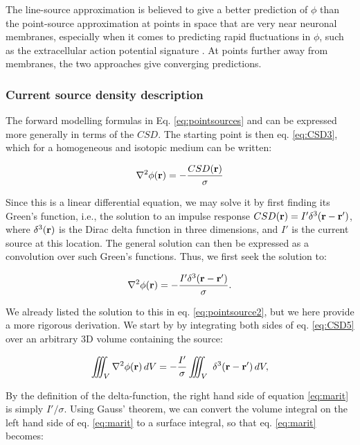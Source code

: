 The line-source approximation is believed to give a better prediction of $\phi$ than the point-source approximation at points in space that are very near neuronal membranes, especially when it comes to predicting rapid fluctuations in $\phi$, such as the extracellular action potential signature \citep{Holt1999}. At points further away from membranes, the two approaches give converging predictions.


\subsubsection{Current source density description}
The forward modelling formulas in Eq. \ref{eq:pointsources} and \label{eq:linesources} can be expressed more generally in terms of the $CSD$. The starting point is then eq. \ref{eq:CSD3}, which for a homogeneous and isotopic medium can be written: 

\begin{equation}
\nabla^2 \phi({\bf r}) = - \frac{CSD({\bf r})}{\sigma}
\label{eq:CSD4}
\end{equation}

Since this is a linear differential equation, we may solve it by first finding its Green's function, i.e., the solution to an impulse response $CSD({\bf r}) = I' \delta^3({\bf r-r'})$, where $\delta^3({\bf r})$ is the Dirac delta function in three dimensions, and $I'$ is the current source at this location. The general solution can then be expressed as a convolution over such Green's functions. Thus, we first seek the solution to: 

\begin{equation}
\nabla^2 \phi({\bf r}) = - \frac{I' \delta^3({\bf r-r'})}{\sigma}.
\label{eq:CSD5}
\end{equation}

We already listed the solution to this in eq. \ref{eq:pointsource2}, but we here provide a more rigorous derivation. We start by by integrating both sides of eq. \ref{eq:CSD5} over an arbitrary 3D volume containing the source:

\begin{equation}
\iiint_V \nabla^2\phi({\bf r}) \,dV =  - \frac{I'}{\sigma} \iiint_V \ \delta^3({\bf r-r'}) \, dV,
\label{eq:marit}
\end{equation}

By the definition of the delta-function, the right hand side of equation \ref{eq:marit} is simply $I'/\sigma$. Using Gauss' theorem, we can convert the volume integral on the left hand side of eq. \ref{eq:marit} to a surface integral, so that eq. \ref{eq:marit} becomes:

